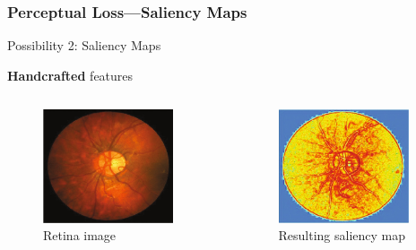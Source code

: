 \documentclass{beamer}
\begin{document}
\begin{frame}
  \frametitle{Perceptual Loss---Saliency Maps}
   \alert{Possibility 2}: Saliency Maps

  \textbf{Handcrafted} features
\begin{columns}
  \begin{column}{0.5\linewidth}
    \begin{figure}[h]
      \centering
        \includegraphics[width=0.9\textwidth]{saliency_gt}
      \caption*{Retina image}
    \end{figure}
  \end{column}
  \begin{column}{0.5\linewidth}
    \begin{figure}[h]
      \centering
        \includegraphics[width=0.9\textwidth]{saliency_smap}
      \caption*{Resulting saliency map}
    \end{figure}
  \end{column} 
\end{columns}
\end{frame}
\end{document}
